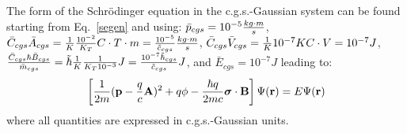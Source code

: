 \documentclass[12pt,a4paper]{article}
\begin{document}
{\color{orange} The form of the Schr\"odinger equation in the c.g.s.-Gaussian
system can be found starting from Eq.~\ref{segen} and using:
$\bar p_{cgs}=10^{-5} {kg\cdot m \over s}$, $\bar C_{cgs} \bar A_{cgs}=
{1\over K} {10^{-2}\over K_T} C\cdot T\cdot m = {10^{-5} \over \tilde c_{cgs}}
{kg\cdot m \over s}$, $\bar C_{cgs} \bar V_{cgs}= {1\over K} 10^{-7} K 
C\cdot V= 10^{-7} J$, ${\bar C_{cgs} \hbar \bar B_{cgs} \over \bar m_{cgs}}
= \tilde \hbar {1\over K} {1\over K_T 10^{-3}} J={10^{-7} \tilde \hbar_{cgs}
\over \tilde c_{cgs}} J$, and $\bar E_{cgs}=10^{-7} J$ leading to:
\begin{equation}
\left[{1\over 2m} ({\bf p}- {q \over c} {\bf A})^2 + 
q \phi - 
{\hbar q \over 2 m c} 
{\boldsymbol \sigma} \cdot {\bf B} \right]
\Psi({\bf r})= E \Psi({\bf r})
\end{equation}
where all quantities are expressed in c.g.s.-Gaussian units.
}

\newpage
\end{document}
